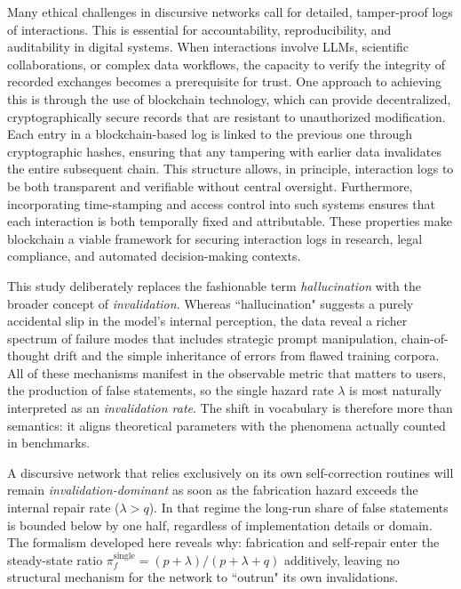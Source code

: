 \documentclass[12pt]{article}
\theoremstyle{definition}
\begin{document}
Many ethical challenges in discursive networks call  for detailed, tamper-proof logs of interactions. This is essential for  accountability, reproducibility, and auditability in digital systems. When interactions involve LLMs, scientific collaborations, or complex data workflows, the capacity to verify the integrity of recorded exchanges becomes a prerequisite for trust. One approach to achieving this is through the use of blockchain technology, which can provide decentralized, cryptographically secure records that are resistant to unauthorized modification. Each entry in a blockchain-based log is linked to the previous one through cryptographic hashes, ensuring that any tampering with earlier data invalidates the entire subsequent chain. This structure allows, in principle, interaction logs to be both transparent and verifiable without central oversight. Furthermore, incorporating time-stamping and access control into such systems ensures that each interaction is both temporally fixed and attributable. These properties make blockchain a viable framework for securing interaction logs in research, legal compliance, and automated decision-making contexts.


This study deliberately replaces the fashionable term
\emph{hallucination} with the broader concept of
\emph{invalidation}.  Whereas ``hallucination" suggests a purely
accidental slip in the model's internal perception, the data reveal a
richer spectrum of failure modes that includes strategic prompt manipulation, chain-of-thought drift and the simple inheritance of errors from flawed training corpora.  All of these mechanisms manifest in the observable metric that matters to users, the production of false statements, so the single hazard rate \(\lambda\) is most naturally interpreted as an \emph{invalidation rate}.  The shift in vocabulary is therefore more than semantics: it aligns theoretical parameters with the phenomena actually counted in benchmarks.

A discursive network that relies exclusively on its own
self-correction routines will remain \emph{invalidation-dominant} as soon
as the fabrication hazard exceeds the internal repair rate
(\(\lambda>q\)).  In that regime the long-run share of false statements
is bounded below by one half, regardless of implementation details or
domain.  The formalism developed here reveals why: fabrication and
self-repair enter the steady-state ratio
\(\pi_f^{\text{single}}=(p+\lambda)/(p+\lambda+q)\) additively, leaving
no structural mechanism for the network to ``outrun" its own
invalidations.
\end{document}
